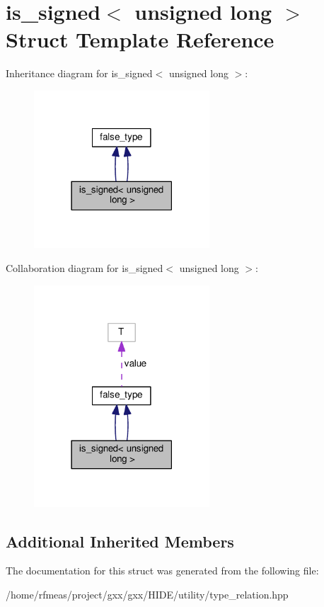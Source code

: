 \hypertarget{structis__signed_3_01unsigned_01long_01_4}{}\section{is\+\_\+signed$<$ unsigned long $>$ Struct Template Reference}
\label{structis__signed_3_01unsigned_01long_01_4}


Inheritance diagram for is\+\_\+signed$<$ unsigned long $>$\+:
\nopagebreak
\begin{figure}[H]
\begin{center}
\leavevmode
\includegraphics[width=186pt]{structis__signed_3_01unsigned_01long_01_4__inherit__graph}
\end{center}
\end{figure}


Collaboration diagram for is\+\_\+signed$<$ unsigned long $>$\+:
\nopagebreak
\begin{figure}[H]
\begin{center}
\leavevmode
\includegraphics[width=186pt]{structis__signed_3_01unsigned_01long_01_4__coll__graph}
\end{center}
\end{figure}
\subsection*{Additional Inherited Members}


The documentation for this struct was generated from the following file\+:\begin{DoxyCompactItemize}
\item 
/home/rfmeas/project/gxx/gxx/\+H\+I\+D\+E/utility/type\+\_\+relation.\+hpp\end{DoxyCompactItemize}

